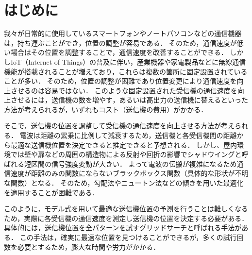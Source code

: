 \documentclass[twocolumn]{ltjarticle}
\begin{document}



\section{はじめに}
我々が日常的に使用しているスマートフォンやノートパソコンなどの通信機器は，持ち運ぶことができ，位置の調整が容易である．
そのため，通信速度が低い場合はその位置を調整することで，通信速度を改善することができる．
しかしIoT（Internet of Things）の普及に伴い，産業機器や家電製品などに無線通信機能が搭載されることが増えており，これらは複数の箇所に固定設置されていることが多い\cite{soumu}．
そのため，位置の調整が困難であり位置変更により通信速度を向上させるのは容易ではない．
このような固定設置された受信機の通信速度を向上させるには，送信機の数を増やす，あるいは高出力の送信機に替えるといった方法が考えられるが，いずれもコスト（送信機の費用）がかかる．

そこで，送信機の位置を調整して受信機の通信速度を向上させる方法が考えられる．
電波は距離の累乗に比例して減衰するため，送信機と各受信機間の距離から最適な送信機位置を決定できると推定できると予想される．
しかし、屋内環境では壁や扉などの周囲の構造物による反射や回折の影響でシャドウイングと呼ばれる短区間の信号強度変動が大きい．
よって電波の伝搬が複雑になるため通信速度が距離のみの関数にならないブラックボックス関数（具体的な形状が不明な関数）となる．
そのため，勾配法やニュートン法などの傾きを用いた最適化を適用することが困難である．

このように，モデル式を用いて最適な送信機位置の予測を行うことは難しくなるため，実際に各受信機の通信速度を測定し送信機の位置を決定する必要がある．
具体的には，送信機位置を全パターンを試すグリッドサーチと呼ばれる手法がある．
この手法は，確実に最適な位置を見つけることができるが，多くの試行回数を必要とするため，膨大な時間や労力がかかる．
\end{document}
